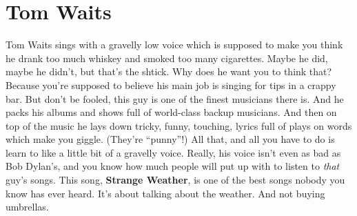 \documentclass[letterpaper,single]{article}
\begin{document}
\section{Tom Waits}
Tom Waits sings with a gravelly low voice which is supposed to make you think he drank too much whiskey and smoked too many cigarettes. 
Maybe he did, maybe he didn't, but that's the shtick. 
Why does he want you to think that? 
Because you're supposed to believe his main job is singing for tips in a crappy bar. 
But don't be fooled, this guy is one of the finest musicians there is. 
And he packs his albums and shows full of world-class backup musicians. 
And then on top of the music he lays down tricky, funny, touching, lyrics full of plays on words which make you giggle.
(They're ``punny''!)
All that, and all you have to do is learn to like a little bit of a gravelly voice. 
Really, his voice isn't even as bad as Bob Dylan's, and you know how much people will put up with to listen to \emph{that} guy's songs.
This song, \textbf{Strange Weather}, is one of the best songs nobody you know has ever heard.
It's about talking about the weather. And not buying umbrellas.
\end{document}
